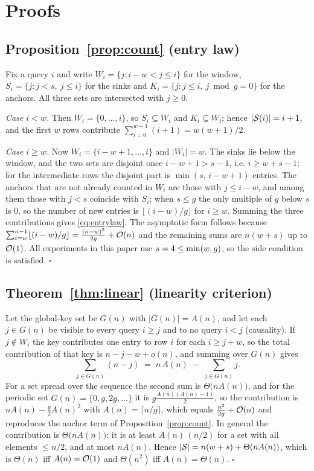 \section{Proofs}\label{app:proofs}

\subsection*{Proposition~\ref{prop:count} (entry law)}

Fix a query $i$ and write $W_i=\{j: i-w<j\le i\}$ for the window,
$S_i=\{j:j<s,\ j\le i\}$ for the sinks and
$K_i=\{j: j\le i,\ j\bmod g=0\}$ for the anchors. All three sets are intersected
with $j\ge 0$.

\emph{Case $i<w$.} Then $W_i=\{0,\dots,i\}$, so $S_i\subseteq W_i$ and
$K_i\subseteq W_i$; hence $\lvert\mathcal{S}(i)\rvert=i+1$, and the first $w$ rows
contribute $\sum_{i=0}^{w-1}(i+1)=w(w+1)/2$.

\emph{Case $i\ge w$.} Now $W_i=\{i-w+1,\dots,i\}$ and $\lvert W_i\rvert=w$. The
sinks lie below the window, and the two sets are disjoint once
$i-w+1>s-1$, i.e. $i\ge w+s-1$; for the intermediate rows the disjoint part is
$\min(s,\,i-w+1)$ entries. The anchors that are not already counted in $W_i$ are
those with $j\le i-w$, and among them those with $j<s$ coincide with $S_i$; when
$s\le g$ the only multiple of $g$ below $s$ is $0$, so the number of new entries is
$\lfloor (i-w)/g\rfloor$ for $i\ge w$. Summing the three contributions gives
\eqref{eq:entrylaw}. The asymptotic form follows because
$\sum_{i=w}^{n-1}\lfloor (i-w)/g\rfloor = \frac{(n-w)^2}{2g}+\mathcal{O}(n)$ and the
remaining sums are $n(w+s)$ up to $\mathcal{O}(1)$. All experiments in this paper use
$s=4\le\min(w,g)$, so the side condition is satisfied. $\square$

\subsection*{Theorem~\ref{thm:linear} (linearity criterion)}

Let the global-key set be $G(n)$ with $\lvert G(n)\rvert=A(n)$, and let each
$j\in G(n)$ be visible to every query $i\ge j$ and to no query $i<j$ (causality).
If $j\notin W_i$ the key contributes one entry to row $i$ for each
$i\ge j+w$, so the total contribution of that key is $n-j-w+o(n)$, and summing over
$G(n)$ gives
\[
\sum_{j\in G(n)} (n-j) \;=\; n\,A(n) \;-\; \sum_{j\in G(n)} j .
\]
For a set spread over the sequence the second sum is
$\Theta\!\big(nA(n)\big)$, and for the periodic set $G(n)=\{0,g,2g,\dots\}$ it is
$g\frac{A(n)(A(n)-1)}{2}$, so the contribution is
$nA(n)-\frac{g}{2}A(n)^2$ with $A(n)=\lceil n/g\rceil$, which equals
$\frac{n^2}{2g}+\mathcal{O}(n)$ and reproduces the anchor term of
Proposition~\ref{prop:count}. In general the contribution is
$\Theta\big(nA(n)\big)$: it is at least $A(n)\,(n/2)$ for a set with all elements
$\le n/2$, and at most $nA(n)$. Hence
$\lvert\mathcal{S}\rvert=n(w+s)+\Theta(nA(n))$, which is $\Theta(n)$ iff
$A(n)=\mathcal{O}(1)$ and $\Theta(n^2)$ iff $A(n)=\Theta(n)$. $\square$

